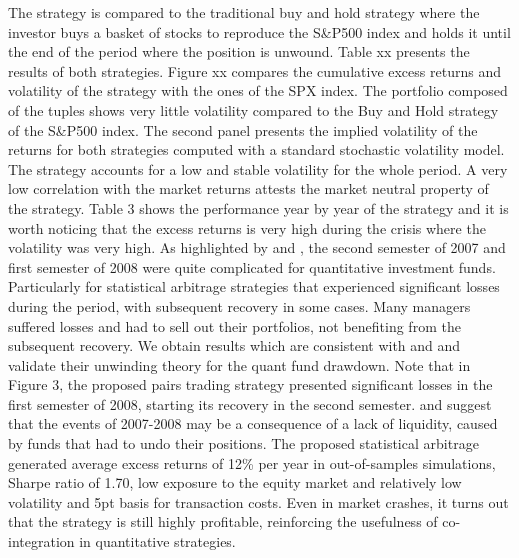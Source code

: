 \documentclass[11pt,a4,twosided,singlespacing,titlepagenumber=on]{scrreprt}
\numberwithin{equation}{chapter} %
\theoremstyle{remark}
\begin{document}
The strategy is compared to the traditional buy and hold strategy where the investor buys a basket of stocks to reproduce the S\&P500 index and holds it until the end of the period where the position is unwound. Table xx presents the results of both strategies. Figure xx compares the cumulative excess returns and volatility of the strategy with the ones of the SPX index. The portfolio composed of the tuples shows very little volatility compared to the Buy and Hold strategy of the S\&P500 index. The second panel presents the implied volatility of the returns for both strategies computed with a standard stochastic volatility model. The strategy accounts for a low and stable volatility for the whole period. A very low correlation with the market returns attests the market neutral property of the strategy. Table 3 shows the performance year by year of the strategy and it is worth noticing that the excess returns is very high during the crisis where the volatility was very high. As highlighted by \cite{khandani2007} and \cite{avellaneda2010}, the second semester of 2007 and first semester of 2008 were quite complicated for quantitative investment funds. Particularly for statistical arbitrage strategies that experienced significant losses during the period, with subsequent recovery in some cases. Many managers suffered losses and had to sell out their portfolios, not benefiting from the subsequent recovery. We obtain results which are consistent with \cite{khandani2007} and \cite{avellaneda2010} and validate their unwinding theory for the quant fund drawdown. Note that in Figure 3, the proposed pairs trading strategy presented significant losses in the first semester of 2008, starting its recovery in the second semester. \cite{khandani2007} and \cite{avellaneda2010} suggest that the events of 2007-2008 may be a consequence of a lack of liquidity, caused by funds that had to undo their positions. The proposed statistical arbitrage generated average excess returns of 12\% per year in out-of-samples simulations, Sharpe ratio of 1.70, low exposure to the equity market and relatively low volatility and 5pt basis for transaction costs. Even in market crashes, it turns out that the strategy is still highly profitable, reinforcing the usefulness of co-integration in quantitative strategies.
\end{document}
